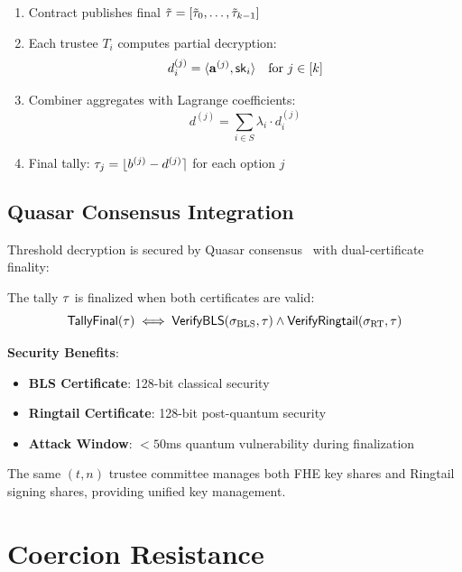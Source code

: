 \documentclass{../shared/luxfhe}
\begin{document}
\begin{protocol}
\begin{enumerate}
    \item Contract publishes final $\tilde{\tau} = [\tilde{\tau}_0, \ldots, \tilde{\tau}_{k-1}]$
    \item Each trustee $T_i$ computes partial decryption:
    \[
    d_i^{(j)} = \langle \mathbf{a}^{(j)}, \mathsf{sk}_i \rangle \quad \text{for } j \in [k]
    \]
    \item Combiner aggregates with Lagrange coefficients:
    \[
    d^{(j)} = \sum_{i \in S} \lambda_i \cdot d_i^{(j)}
    \]
    \item Final tally: $\tau_j = \lfloor b^{(j)} - d^{(j)} \rceil$ for each option $j$
\end{enumerate}
\end{protocol}

\subsection{Quasar Consensus Integration}

Threshold decryption is secured by Quasar consensus~\cite{quasar} with dual-certificate finality:

\begin{definition}
The tally $\tau$ is finalized when both certificates are valid:
\[
\mathsf{TallyFinal}(\tau) \iff \mathsf{VerifyBLS}(\sigma_{\text{BLS}}, \tau) \land \mathsf{VerifyRingtail}(\sigma_{\text{RT}}, \tau)
\]
\end{definition}

\textbf{Security Benefits}:
\begin{itemize}[noitemsep]
    \item \textbf{BLS Certificate}: 128-bit classical security
    \item \textbf{Ringtail Certificate}: 128-bit post-quantum security~\cite{ringtail}
    \item \textbf{Attack Window}: $<50$ms quantum vulnerability during finalization
\end{itemize}

The same $(t, n)$ trustee committee manages both FHE key shares and Ringtail signing shares, providing unified key management.

\section{Coercion Resistance}
\end{document}
